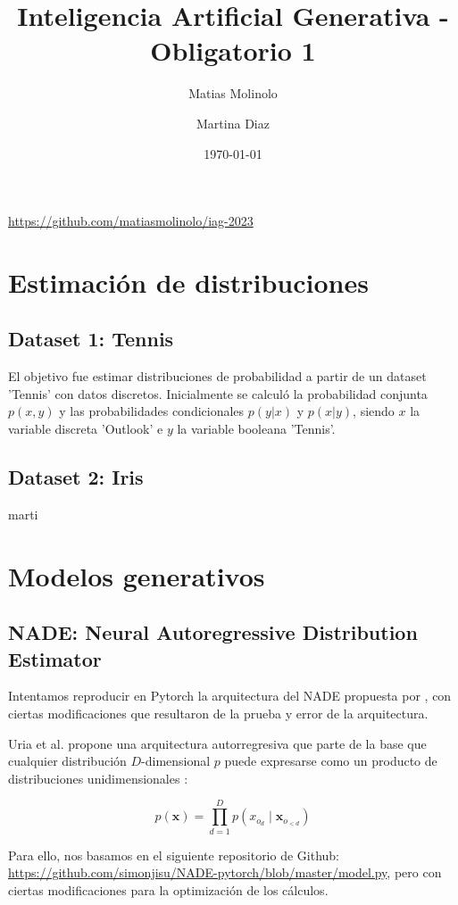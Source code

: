 \documentclass[11pt]{article}
\title{Inteligencia Artificial Generativa - Obligatorio 1}
\author{Matias Molinolo}
\author{Martina Diaz}
\affil{Facultad de Ingeniería, Universidad ORT Uruguay}
\date{\today}
\begin{document}
\maketitle
\begin{center}
    \url{https://github.com/matiasmolinolo/iag-2023}
\end{center}
\thispagestyle{empty}
\newpage
\tableofcontents
\newpage

\section{Estimación de distribuciones}

\subsection{Dataset 1: Tennis}
El objetivo fue estimar distribuciones de probabilidad a partir de un dataset 'Tennis' con datos discretos. Inicialmente se calculó la probabilidad conjunta $p(x,y)$ y las probabilidades condicionales $p(y|x)$ y $p(x|y)$, siendo $x$ la variable discreta 'Outlook' e $y$ la variable booleana 'Tennis'. 

\subsection{Dataset 2: Iris}
marti

\section{Modelos generativos}
\subsection{NADE: Neural Autoregressive Distribution Estimator}

Intentamos reproducir en Pytorch la arquitectura del NADE propuesta por \cite{nade}, con ciertas modificaciones que resultaron de la prueba y error de la arquitectura.

Uria et al. propone una arquitectura autorregresiva que parte de la base que cualquier distribución $D$-dimensional $p$ puede expresarse como un producto de distribuciones unidimensionales \cite{nade}:

$$
p(\boldsymbol{x}) = \prod_{d=1}^{D}p(x_{o_d} \mid \boldsymbol{x}_{o_{<d}})
$$

Para ello, nos basamos en el siguiente repositorio de Github: \url{https://github.com/simonjisu/NADE-pytorch/blob/master/model.py}, pero con ciertas modificaciones para la optimización de los cálculos.
\end{document}
